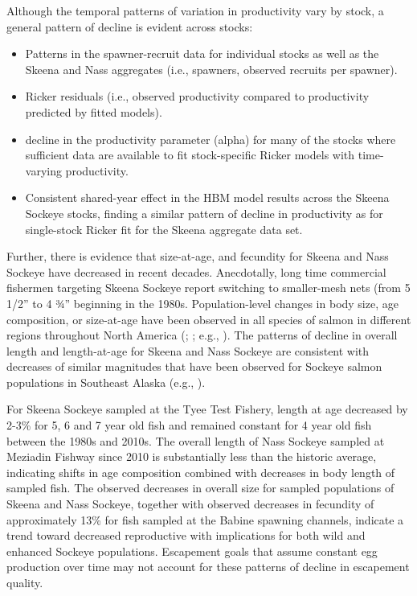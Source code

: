 \documentclass[french,11pt]{book}
\begin{document}
Although the temporal patterns of variation in productivity vary by stock, a general pattern of decline is evident across stocks:
\begin{itemize}

\item
  Patterns in the spawner-recruit data for individual stocks as well as the Skeena and Nass aggregates (i.e., spawners, observed recruits per spawner).
\item
  Ricker residuals (i.e., observed productivity compared to productivity predicted by fitted models).
\item
  decline in the productivity parameter (alpha) for many of the stocks where sufficient data are available to fit stock-specific Ricker models with time-varying productivity.
\item
  Consistent shared-year effect in the HBM model results across the Skeena Sockeye stocks, finding a similar pattern of decline in productivity as for single-stock Ricker fit for the Skeena aggregate data set.
\end{itemize}
Further, there is evidence that size-at-age, and fecundity for Skeena and Nass Sockeye have decreased in recent decades. Anecdotally, long time commercial fishermen targeting Skeena Sockeye report switching to smaller-mesh nets (from 5 1/2'' to 4 ¾'' beginning in the 1980s. Population-level changes in body size, age composition, or size-at-age have been observed in all species of salmon in different regions throughout North America (; ; e.g., ). The patterns of decline in overall length and length-at-age for Skeena and Nass Sockeye are consistent with decreases of similar magnitudes that have been observed for Sockeye salmon populations in Southeast Alaska (e.g., ).

For Skeena Sockeye sampled at the Tyee Test Fishery, length at age decreased by 2-3\% for 5, 6 and 7 year old fish and remained constant for 4 year old fish between the 1980s and 2010s. The overall length of Nass Sockeye sampled at Meziadin Fishway since 2010 is substantially less than the historic average, indicating shifts in age composition combined with decreases in body length of sampled fish. The observed decreases in overall size for sampled populations of Skeena and Nass Sockeye, together with observed decreases in fecundity of approximately 13\% for fish sampled at the Babine spawning channels, indicate a trend toward decreased reproductive with implications for both wild and enhanced Sockeye populations. Escapement goals that assume constant egg production over time may not account for these patterns of decline in escapement quality.
\end{document}
